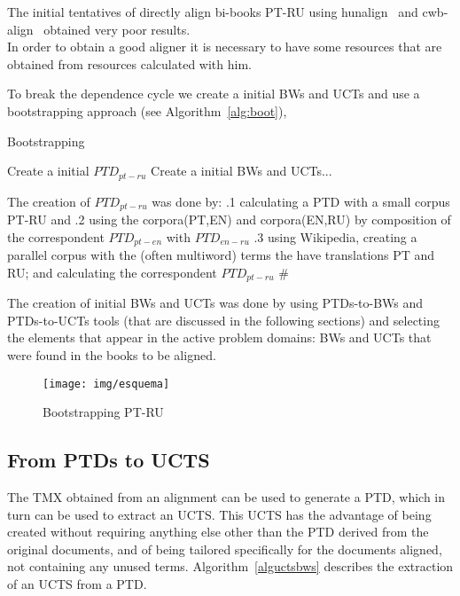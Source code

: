 \documentclass[a4paper,russian,UKenglish]{oasics}
\def\UCTSS{{\sc UCTS}}
\def\PTDS{{\sc PTDs}}
\begin{document}
The initial tentatives of directly align bi-books PT-RU using hunalign~\cite{varga2005parallel}
and cwb-align~\cite{ims} obtained very poor results.\\

In order to obtain a good aligner it is necessary to have
some resources that are obtained from resources calculated with him.

To break the dependence cycle we create a initial BWs and UCTs and
use a bootstrapping approach (see Algorithm~\ref{alg:boot}),

\begin{algorithm}
\DontPrintSemicolon
   \caption{Bootstrapping\label{alg:boot}}

Create a initial $PTD_{pt-ru}$\;
Create a initial BWs and UCTs...\;

\end{algorithm}


The creation of $PTD_{pt-ru}$ was done by:
  .1 calculating a PTD with a small corpus PT-RU and 
  .2 using the corpora(PT,EN) and corpora(EN,RU) by composition 
 of the correspondent $PTD_{pt-en}$ with $PTD_{en-ru}$
  .3 using Wikipedia, creating a parallel corpus with the (often multiword) terms
 the have translations PT and RU; and calculating the correspondent $PTD_{pt-ru}$ 
  #

The creation of initial BWs and UCTs was done by using PTDs-to-BWs and PTDs-to-UCTs
tools (that are discussed in the following sections) and selecting the elements 
that appear in the active problem domains: BWs and UCTs that were found in the books to be aligned.

\begin{figure*}
\texttt{[image: img/esquema]}
\caption{Bootstrapping PT-RU}
\end{figure*}




\subsection{From \PTDS{} to \UCTSS}
The TMX obtained from an alignment can be used to generate a PTD, which in turn can be used to extract an UCTS. This UCTS has the advantage of being created without requiring anything else other than the PTD derived from the original documents, and of being tailored specifically for the documents aligned, not containing any unused terms. Algorithm~\ref{alguctsbws} describes the extraction of an UCTS from a PTD.
\end{document}
